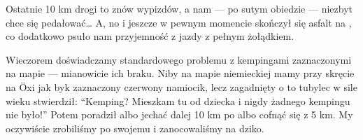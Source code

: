 Ostatnie 10 km drogi to znów wypizdów, a nam --- po sutym obiedzie --- niezbyt chce się pedałować… A, no i jeszcze w pewnym momencie skończył się asfalt na , co dodatkowo psuło nam przyjemność z jazdy z pełnym żołądkiem.


Wieczorem doświadczamy standardowego problemu z kempingami zaznaczonymi na mapie --- mianowicie ich braku. Niby na mapie niemieckiej mamy przy skręcie na Öxi jak byk zaznaczony czerwony namiocik, lecz zagadnięty o to tubylec w sile wieku stwierdził: “Kemping? Mieszkam tu od dziecka i nigdy żadnego kempingu nie było!” Potem poradził albo jechać dalej 10 km po  albo cofnąć się z 5 km. My oczywiście zrobiliśmy po swojemu i zanocowaliśmy na dziko.
